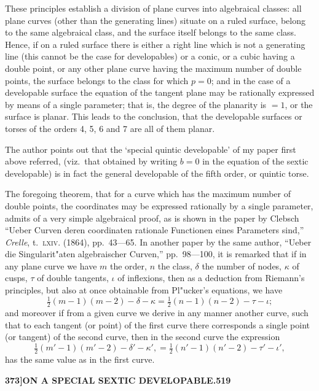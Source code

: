 \documentclass[11pt,a4paper]{article}
\begin{document}
These principles establish a division of plane curves into algebraical classes: all plane curves (other than the generating lines) situate on a ruled surface, belong to the same algebraical class, and the surface itself belongs to the same class. Hence, if on a ruled surface there is either a right line which is not a generating line (this cannot be the case for developables) or a conic, or a cubic having a double point, or any other plane curve having the maximum number of double points, the surface belongs to the class for which $p = 0$; and in the case of a developable surface the equation of the tangent plane may be rationally expressed by means of a single parameter; that is, the degree of the planarity is $= 1$, or the surface is planar. This leads to the conclusion, that the developable surfaces or torses of the orders 4, 5, 6 and 7 are all of them planar.

The author points out that the `special quintic developable' of my paper first above referred, (viz.~that obtained by writing $b = 0$ in the equation of the sextic developable) is in fact the general developable of the fifth order, or quintic torse.

The foregoing theorem, that for a curve which has the maximum number of double points, the coordinates may be expressed rationally by a single parameter, admits of a very simple algebraical proof, as is shown in the paper by Clebsch ``Ueber Curven deren coordinaten rationale Functionen eines Parameters sind,'' \textit{Crelle}, t.~\textsc{lxiv}. (1864), pp.~43---65. In another paper by the same author, ``Ueber die Singularit"{a}ten algebraischer Curven,'' pp.~98---100, it is remarked that if in any plane curve we have $m$ the order, $n$ the class, $\delta$ the number of nodes, $\kappa$ of cusps, $\tau$ of double tangents, $\iota$ of inflexions, then as a deduction from Riemann's principles, but also at once obtainable from Pl"{u}cker's equations, we have
\[
\tfrac{1}{2}(m - 1)(m - 2) - \delta - \kappa = \tfrac{1}{2}(n - 1)(n - 2) - \tau - \iota;
\]
and moreover if from a given curve we derive in any manner another curve, such that to each tangent (or point) of the first curve there corresponds a single point (or tangent) of the second curve, then in the second curve the expression
\[
\tfrac{1}{2}(m' - 1)(m' - 2) - \delta' - \kappa', = \tfrac{1}{2}(n' - 1)(n' - 2) - \tau' - \iota',
\]
has the same value as in the first curve.

\newpage
\begin{flushright}
\textbf{373]\hspace{1em}ON A SPECIAL SEXTIC DEVELOPABLE.\hfill519}
\end{flushright}
\end{document}

